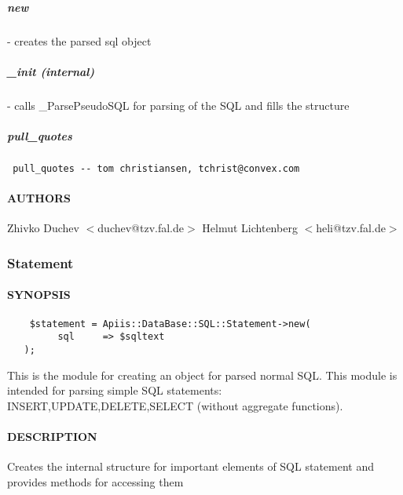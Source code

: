 \subparagraph*{new\label{PseudoStatement_new}}


- creates the parsed sql object

\subparagraph*{\_init (internal)\label{PseudoStatement__init_internal_}}


- calls \_ParsePseudoSQL for parsing of the SQL and fills the structure

\subparagraph*{pull\_quotes\label{PseudoStatement_pull_quotes}}
\begin{verbatim}
 pull_quotes -- tom christiansen, tchrist@convex.com
\end{verbatim}
\paragraph*{AUTHORS\label{PseudoStatement_AUTHORS}}


Zhivko Duchev $<$duchev@tzv.fal.de$>$
Helmut Lichtenberg $<$heli@tzv.fal.de$>$

\subsubsection{Statement\label{Statement}}




\paragraph*{SYNOPSIS\label{Statement_SYNOPSIS}}
\begin{verbatim}
    $statement = Apiis::DataBase::SQL::Statement->new(
         sql     => $sqltext
   );
\end{verbatim}


This is the module for creating an object for parsed normal SQL. This module is intended for parsing simple SQL statements: INSERT,UPDATE,DELETE,SELECT (without aggregate functions).

\paragraph*{DESCRIPTION\label{Statement_DESCRIPTION}}


Creates the internal structure for important elements of SQL statement and provides methods for accessing them



